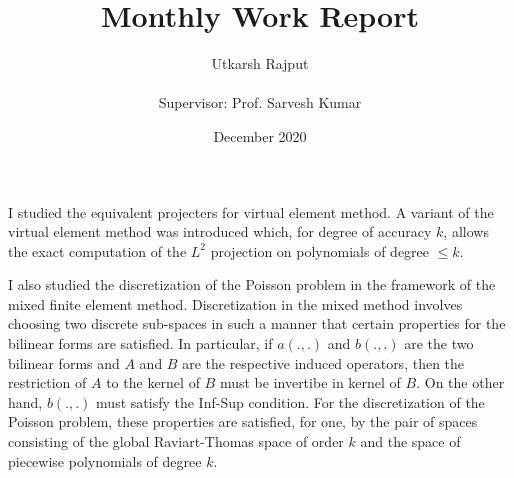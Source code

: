 \documentclass[12pt]{article}
\title{Monthly Work Report}
\date{December 2020}
\author{Utkarsh Rajput \\\\{Supervisor: Prof. Sarvesh Kumar}}
\begin{document}
	\maketitle
	I studied the equivalent projecters for virtual element method. A variant of the virtual element method was introduced which, for degree of accuracy $k$, allows the exact computation of the $L^2$ projection on polynomials of degree $\le k$.
	
	I also studied the discretization of the Poisson problem in the framework of the mixed finite element method. Discretization in the mixed method involves choosing two discrete sub-spaces in such a manner that certain properties for the bilinear forms are satisfied. In particular, if $a(.,.)$ and $b(.,.)$ are the two bilinear forms and $A$ and $B$ are the respective induced operators, then the restriction of $A$ to the kernel of $B$ must be invertibe in kernel of $B$. On the other hand, $b(.,.)$ must satisfy the Inf-Sup condition. For the discretization of the Poisson problem, these properties are satisfied, for one, by the pair of spaces consisting of the global Raviart-Thomas space of order $k$ and the space of piecewise polynomials of degree $k$.

	
\end{document}

